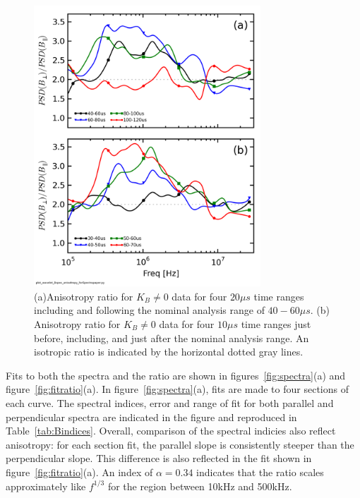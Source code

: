 \documentclass[aip,prl,amsmath,amssymb,reprint,superscriptaddress]{revtex4-1} %
\begin{document}
\begin{figure}[!htbp]
\centerline{
\includegraphics[width=8.5cm]{Bperppara_chan1t4_1mWbspectra_timescan}}
\caption{\label{fig:timeratio} (a)Anisotropy ratio for $K_{B}\neq 0$ data for four $20\mu s$ time ranges including and following the nominal analysis range of $40-60\mu s$. (b) Anisotropy ratio for $K_{B}\neq 0$ data for four $10\mu s$ time ranges just before, including, and just after the nominal analysis range. An isotropic ratio is indicated by the horizontal dotted gray lines.}
\end{figure}

Fits to both the spectra and the ratio are shown in figures~\ref{fig:spectra}(a) and figure~\ref{fig:fitratio}(a). In figure~\ref{fig:spectra}(a), fits are made to four sections of each curve. The spectral indices, error and range of fit for both parallel and perpendicular spectra are indicated in the figure and reproduced in Table~\ref{tab:Bindices}. Overall, comparison of the spectral indicies also reflect anisotropy: for each section fit, the parallel slope is consistently steeper than the perpendicular slope. This difference is also reflected in the fit shown in figure~\ref{fig:fitratio}(a). An index of $\alpha = 0.34$ indicates that the ratio scales approximately like $f^{1/3}$ for the region between 10kHz and 500kHz.
\end{document}
